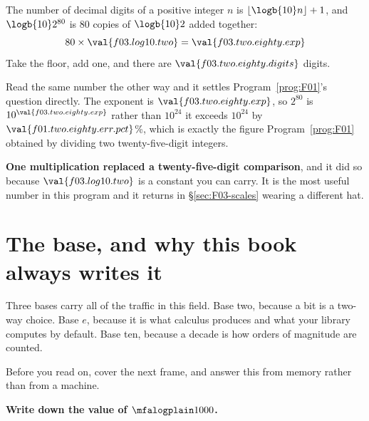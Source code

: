 \begin{fr}
The number of decimal digits of a positive integer $n$ is
$\lfloor \logb{10} n \rfloor + 1$, and $\logb{10} 2^{80}$ is $80$ copies of
$\logb{10} 2$ added together:
\[ 80 \times \val{f03.log10.two} = \val{f03.two.eighty.exp} \]
Take the floor, add one, and there are $\val{f03.two.eighty.digits}$ digits.

Read the same number the other way and it settles Program~\ref{prog:F01}'s
question directly. The exponent is $\val{f03.two.eighty.exp}$, so $2^{80}$ is
$10^{\val{f03.two.eighty.exp}}$ rather than $10^{24}$ \dash{} it exceeds
$10^{24}$ by $\val{f01.two.eighty.err.pct}$\%, which is exactly the figure
Program~\ref{prog:F01} obtained by dividing two twenty-five-digit integers.

\textbf{One multiplication replaced a twenty-five-digit comparison}, and it did
so because $\val{f03.log10.two}$ is a constant you can carry. It is the most
useful number in this program and it returns in \S\ref{sec:F03-scales} wearing
a different hat.
\end{fr}

\section{The base, and why this book always writes it}
\label{sec:F03-base}

\begin{fr}
Three bases carry all of the traffic in this field. Base two, because a bit is
a two-way choice. Base $e$, because it is what calculus produces and what your
library computes by default. Base ten, because a decade is how orders of
magnitude are counted.

Before you read on, cover the next frame, and answer this from memory
rather than from a machine.

\textbf{Write down the value of $\mfalogplain 1000$.}
\dotline
\nextframe
\end{fr}

